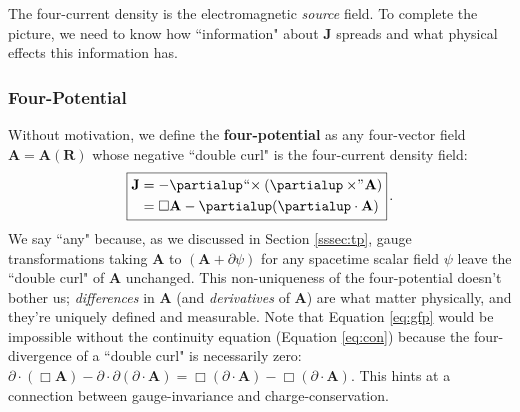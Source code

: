 \documentclass[12pt]{article}
\renewcommand{\vv}[1]{\mathbf{#1}}
\begin{document}
The four-current density is the electromagnetic \emph{source} field. To complete the picture, we need to know how ``information" about $\vv J$ spreads and what physical effects this information has.


\subsubsection{Four-Potential}\label{sssec:fp}

Without motivation, we define the \textbf{four-potential} as any four-vector field $\vv A = \vv A (\vv R)$ whose negative ``double curl" is the four-current density field:
\begin{equation}\label{eq:gfp}
\boxed{
\begin{split}
\vv J &= - \partialup \mkern1mu `` \mkern-4mu \times ( \partialup \times \mkern-4mu " \mkern1mu \vv A ) \\
&= \Box \vv A - \partialup ( \partialup \cdot \vv A)
\end{split}
} \, .
\end{equation}
We say ``any" because, as we discussed in Section \ref{sssec:tp}, gauge transformations taking $\vv A$ to $(\vv A + \partialup \psi)$ for any spacetime scalar field $\psi$ leave the ``double curl" of $\vv A$ unchanged. This non-uniqueness of the four-potential doesn't bother us; \emph{differences} in $\vv A$ (and \emph{derivatives} of $\vv A$) are what matter physically, and they're uniquely defined and measurable. Note that Equation \ref{eq:gfp} would be impossible without the continuity equation (Equation \ref{eq:con}) because the four-divergence of a ``double curl" is necessarily zero: $\partialup \cdot (\Box \vv A) - \partialup \cdot \partialup (\partialup \cdot \vv A) = \Box (\partialup \cdot \vv A) - \Box (\partialup \cdot \vv A)$. This hints at a connection between gauge-invariance and charge-conservation.
\end{document}
